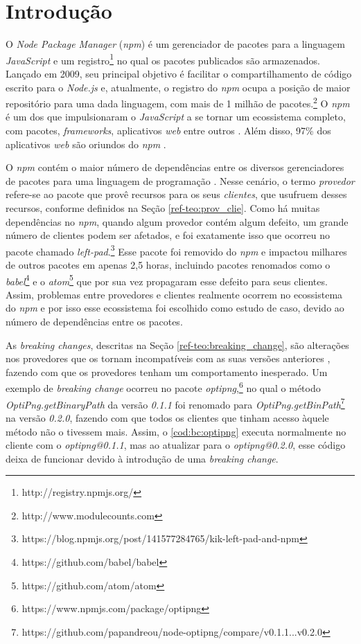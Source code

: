 \chapter{Introdução}
\label{cap:introducao}

O \textit{Node Package Manager} (\textit{npm}) é um gerenciador de pacotes para a linguagem \textit{JavaScript} e um registro\footnote{http://registry.npmjs.org/} no qual os pacotes publicados são armazenados. Lançado em 2009, seu principal objetivo é facilitar o compartilhamento de código escrito para o \textit{Node.js} e, atualmente, o registro do \textit{npm} ocupa a posição de maior repositório para uma dada linguagem, com mais de 1 milhão de pacotes.\footnote{http://www.modulecounts.com} O \textit{npm} é um dos que impulsionaram o \textit{JavaScript} a se tornar um ecossistema completo, com pacotes, \textit{frameworks}, aplicativos \textit{web} entre outros \cite{introduction:npm}. Além disso,  97\% dos aplicativos \textit{web} são oriundos do \textit{npm} \cite{stack_research}.

O \textit{npm} contém o maior número de dependências entre os diversos gerenciadores de pacotes para uma linguagem de programação \cite{teorical_reference:npm_2}. Nesse cenário, o termo \textit{provedor} refere-se ao pacote que provê recursos para os seus \textit{clientes}, que usufruem desses recursos, conforme definidos na Seção \ref{ref-teo:prov_clie}. Como há muitas dependências no \textit{npm}, quando algum provedor contém algum defeito, um grande número de clientes podem ser afetados, e foi exatamente isso que ocorreu no pacote chamado \textit{left-pad}.\footnote{https://blog.npmjs.org/post/141577284765/kik-left-pad-and-npm} Esse pacote foi removido do \textit{npm} e impactou milhares de outros pacotes em apenas 2,5 horas, incluindo pacotes renomados como o \textit{babel}\footnote{https://github.com/babel/babel} e o \textit{atom}\footnote{https://github.com/atom/atom} que por sua vez propagaram esse defeito para seus clientes. Assim, problemas entre provedores e clientes realmente ocorrem no ecossistema do \textit{npm} e por isso esse ecossistema foi escolhido como estudo de caso, devido ao número de dependências entre os pacotes.

As \textit{breaking changes}, descritas na Seção \ref{ref-teo:breaking_change}, são alterações nos provedores que os tornam incompatíveis com as suas versões anteriores \cite{intro:break_change}, fazendo com que os provedores tenham um comportamento inesperado. Um exemplo de \textit{breaking change} ocorreu no pacote \textit{optipng},\footnote{https://www.npmjs.com/package/optipng} no qual o método \textit{OptiPng.getBinaryPath} da versão \textit{0.1.1} foi renomado para \textit{OptiPng.getBinPath}\footnote{https://github.com/papandreou/node-optipng/compare/v0.1.1...v0.2.0} na versão \textit{0.2.0}, fazendo com que todos os clientes que tinham acesso àquele método não o tivessem mais. Assim, o \cref{cod:bc:optipng} executa normalmente no cliente com o \textit{optipng@0.1.1}, mas ao atualizar para o \textit{optipng@0.2.0}, esse código deixa de funcionar devido à introdução de uma \textit{breaking change}.


